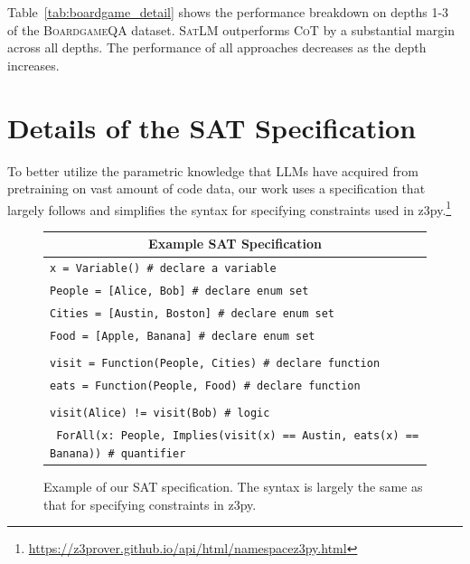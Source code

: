 \documentclass{article}
\theoremstyle{definition}
\newcommand{\boardgame}{\textsc{BoardgameQA}}
\newcommand{\cotlm}{\textsc{CoT}}
\newcommand{\satlm}{\textsc{SatLM}}
\begin{document}
Table~\ref{tab:boardgame_detail} shows the performance breakdown on depths 1-3 of the \boardgame{} dataset. \satlm{} outperforms \cotlm{} by a substantial margin across all depths. The performance of all approaches decreases as the depth increases.

\section{Details of the SAT Specification}
\label{app:detailed_specification}
To better utilize the parametric knowledge that LLMs have acquired from pretraining on vast amount of code data, our work uses a specification that largely follows and simplifies the syntax for specifying constraints used in z3py.\footnote{\url{https://z3prover.github.io/api/html/namespacez3py.html}}

\begin{figure}[h]
    \footnotesize
    \centering
    \begin{tabularx}{\linewidth}{X}
    \toprule
        \multicolumn{1}{c}{\bf Example SAT Specification} \\
         \midrule
\tt\small x = Variable() \# declare a variable \\
\tt\small People = [Alice, Bob] \# declare enum set \\
\tt\small Cities = [Austin, Boston] \# declare enum set \\
\tt\small Food = [Apple, Banana] \# declare enum set \\
\\
\tt\small visit = Function(People, Cities) \# declare function \\
\tt\small eats = Function(People, Food) \# declare function \\
\\
\tt\small  visit(Alice) != visit(Bob)  \# logic \\
\tt\small
\tt\small ForAll(x: People, Implies(visit(x) == Austin, eats(x) == Banana)) \# quantifier \\
    \bottomrule
    \end{tabularx}
    \caption{ Example of our SAT specification. The syntax is largely the same as that for specifying constraints in z3py. }
    \label{fig:exs_sat_specification}
\end{figure}
\end{document}
